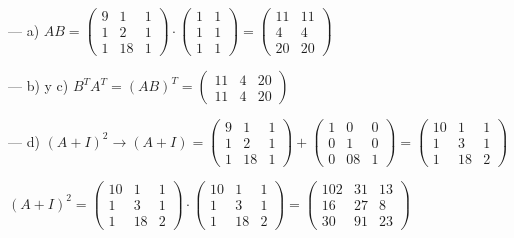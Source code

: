 \begin{proofw}\renewcommand{\qedsymbol}{$\diamond$}

\noindent	--- a) $AB=\left( \begin{matrix}  9&1&1\\1&2&1\\1&18&1 \end{matrix} \right) \cdot \left( \begin{matrix}  1&1\\1&1\\1&1 \end{matrix} \right) = \left( \begin{matrix} 11&11\\4&4\\20&20  \end{matrix} \right)$ 

\noindent --- b) y c)  $B^TA^T=(AB)^T=\left( \begin{matrix}11&4&20\\11&4&20  \end{matrix} \right)$ 

\noindent --- d) $(A+I)^2\to (A+I)= \left( \begin{matrix}  9&1&1\\1&2&1\\1&18&1 \end{matrix} \right) +  \left( \begin{matrix}  1&0&0\\0&1&0\\0&08&1 \end{matrix} \right)=
 \left( \begin{matrix}  10&1&1\\1&3&1\\1&18&2 \end{matrix} \right)$
 
 \noindent $(A+I)^2=  \left( \begin{matrix}  10&1&1\\1&3&1\\1&18&2 \end{matrix} \right) \cdot  \left( \begin{matrix}  10&1&1\\1&3&1\\1&18&2 \end{matrix} \right) =
  \left( \begin{matrix}  102&31&13\\16&27&8\\30&91&23 \end{matrix} \right)$
  

\end{proofw}
